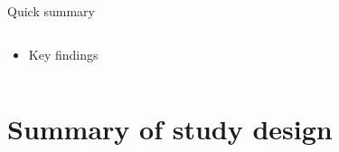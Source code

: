 \begin{frame}{Quick summary}
  
  \begin{columns}[T]
  \begin{column}{9cm}
  \centering

    \begin{itemize}
    \item Key findings
    \end{itemize}
  \end{column}
  \end{columns}
  
\end{frame}


\section{Summary of study design}

